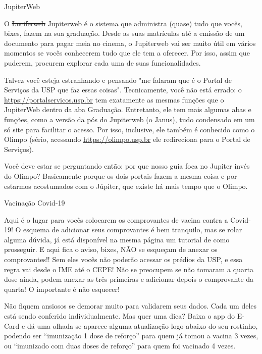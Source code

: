 \begin{secao}{JupiterWeb}

O \sout{Luciferweb} Jupiterweb é o sistema que administra (quase) tudo que
vocês, bixes, fazem na sua graduação. Desde as suas matrículas até a emissão de
um documento para pagar meia no cinema, o Jupiterweb vai ser muito útil em
vários momentos se vocês conhecerem tudo que ele tem a oferecer. Por isso,
assim que puderem, procurem explorar cada uma de suas funcionalidades.

Talvez você esteja estranhando e pensando "me falaram que é o Portal de Serviços da USP
que faz essas coisas". Tecnicamente, você não está errado: o \url{https://portalservicos.usp.br}
tem exatamente as mesmas funções que o JupiterWeb dentro da aba Graduação.
Entretanto, ele tem mais algumas abas e funções, como a versão da pós do Jupiterweb (o Janus),
tudo condensado em um só site para facilitar o acesso.
Por isso, inclusive, ele também é conhecido como o Olimpo (sério, acessando \url{https://olimpo.usp.br}
ele redireciona para o Portal de Serviços).

Você deve estar se perguntando então: por que nosso guia foca no Jupiter invés do Olimpo?
Basicamente porque os dois portais fazem a mesma coisa e por estarmos acostumados com o Júpiter,
que existe há mais tempo que o Olimpo.

\begin{subsecao}{Vacinação Covid-19} %

Aqui é o lugar para vocês colocarem os comprovantes de vacina contra a Covid-19! 
O esquema de adicionar seus comprovantes é bem tranquilo, mas se rolar alguma
dúvida, já está disponível na mesma página um tutorial de como prosseguir. E
aqui fica o aviso, bixes, NÃO se esqueçam de anexar os comprovantes!! Sem eles
vocês não poderão acessar os prédios da USP, e essa regra vai desde o IME até o
CEPE! Não se preocupem se não tomaram a quarta dose ainda, podem anexar as três
primeiras e adicionar depois o comprovante da quarta! O importante é não esquecer!

Não fiquem ansiosos se demorar muito para validarem seus dados. Cada um deles está
sendo conferido individualmente. Mas quer uma dica? Baixa o app do E-Card e dá uma
olhada se aparece alguma atualização logo abaixo do seu rostinho, podendo ser
``imunização 1 dose de reforço'' para quem já tomou a vacina 3 vezes, ou ``imunizado com 
duas doses de reforço'' para quem foi vacinado 4 vezes.
\end{subsecao}


\end{secao}
